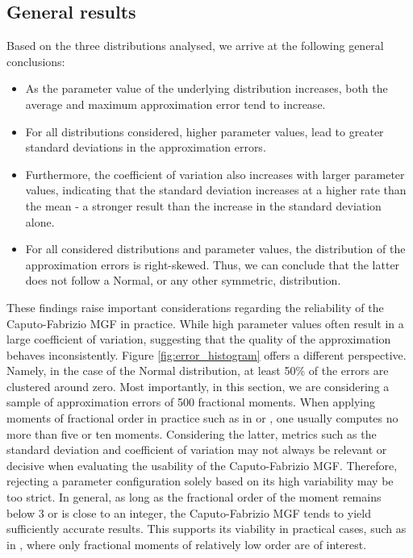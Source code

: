 \subsection{General results}
Based on the three distributions analysed, we arrive at the following  general conclusions:
\begin{itemize}
    \item As the parameter value of the underlying distribution increases, both the average and maximum approximation error tend to increase.
    \item For all distributions considered, higher parameter values, lead to greater standard deviations in the approximation errors.
    \item Furthermore, the coefficient of variation also increases with larger parameter values, indicating that the standard deviation increases at a higher rate than the mean - a stronger result than the increase in the standard deviation alone.
    \item For all considered distributions and parameter values, the distribution of the approximation errors is right-skewed. Thus, we can conclude that the latter does not follow a Normal, or any other symmetric, distribution.
\end{itemize}
These findings raise important considerations regarding the reliability of the Caputo-Fabrizio MGF in practice. While high parameter values often result in a large coefficient of variation, suggesting that the quality of the approximation behaves inconsistently. Figure \ref{fig:error_histogram} offers a different perspective. Namely, in the case of the Normal distribution, at least 50\% of the errors are clustered around zero. Most importantly, in this section, we are considering a sample of approximation errors of 500 fractional moments. When applying moments of fractional order in practice such as in \citet{hansen2024} or \citet{gyzl2013}, one usually computes no more than five or ten moments. Considering the latter, metrics such as the standard deviation and coefficient of variation may not always be relevant or decisive when evaluating the usability of the Caputo-Fabrizio MGF. Therefore, rejecting a parameter configuration solely based on its high variability may be too strict. In general, as long as the fractional order of the moment remains below 3 or is close to an integer, the Caputo-Fabrizio MGF tends to yield sufficiently accurate results. This supports its viability in practical cases, such as in \citet{hansen2024}, where only fractional moments of relatively low order are of interest.